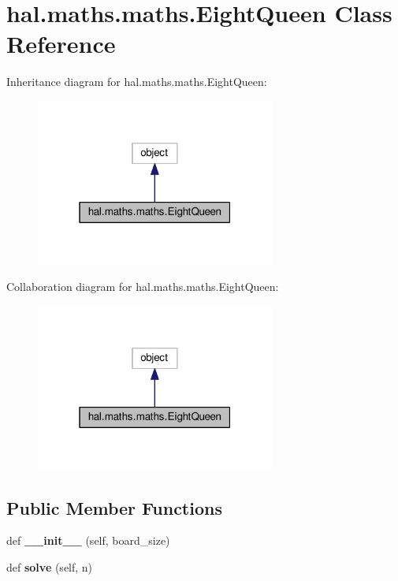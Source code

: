\hypertarget{classhal_1_1maths_1_1maths_1_1_eight_queen}{}\section{hal.\+maths.\+maths.\+Eight\+Queen Class Reference}
\label{classhal_1_1maths_1_1maths_1_1_eight_queen}


Inheritance diagram for hal.\+maths.\+maths.\+Eight\+Queen\+:\nopagebreak
\begin{figure}[H]
\begin{center}
\leavevmode
\includegraphics[width=223pt]{classhal_1_1maths_1_1maths_1_1_eight_queen__inherit__graph}
\end{center}
\end{figure}


Collaboration diagram for hal.\+maths.\+maths.\+Eight\+Queen\+:\nopagebreak
\begin{figure}[H]
\begin{center}
\leavevmode
\includegraphics[width=223pt]{classhal_1_1maths_1_1maths_1_1_eight_queen__coll__graph}
\end{center}
\end{figure}
\subsection*{Public Member Functions}
\begin{DoxyCompactItemize}
\item 
def {\bfseries \+\_\+\+\_\+init\+\_\+\+\_\+} (self, board\+\_\+size)\hypertarget{classhal_1_1maths_1_1maths_1_1_eight_queen_a71642e4346629fda32e51c647c28fa3f}{}\label{classhal_1_1maths_1_1maths_1_1_eight_queen_a71642e4346629fda32e51c647c28fa3f}

\item 
def {\bfseries solve} (self, n)\hypertarget{classhal_1_1maths_1_1maths_1_1_eight_queen_a8147e8ea2dabfa44b3c8d13e04d7b529}{}\label{classhal_1_1maths_1_1maths_1_1_eight_queen_a8147e8ea2dabfa44b3c8d13e04d7b529}

\end{DoxyCompactItemize}
